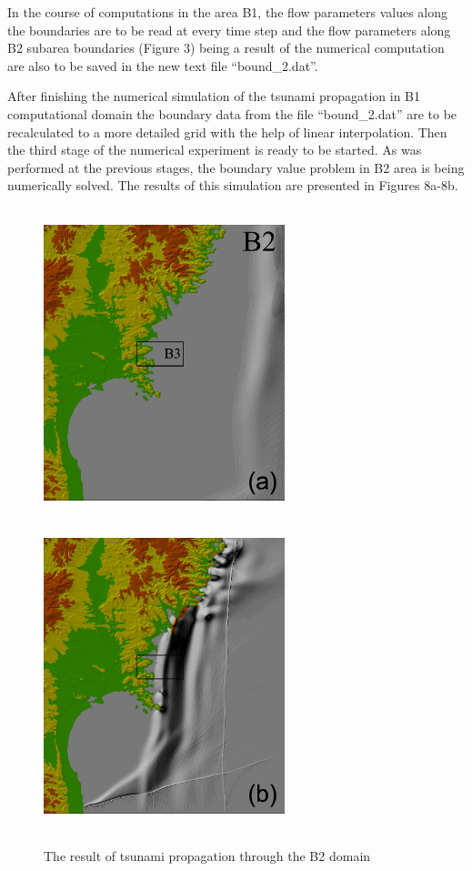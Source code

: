 \documentclass{aip-cp}
\begin{document}
In the course of computations in the area B1, the flow parameters values 
along the boundaries are to be read at every time step and the flow 
parameters along B2 subarea boundaries (Figure 3) being a result of the 
numerical computation are also to be saved in the new text file 
``bound{\_}2.dat''. 

After finishing the numerical simulation of the tsunami propagation in B1 
computational domain the boundary data from the file ``bound{\_}2.dat'' are 
to be recalculated to a more detailed grid with the help of linear 
interpolation. Then the third stage of the numerical experiment is ready to 
be started. As was performed at the previous stages, the boundary value 
problem in B2 area is being numerically solved. The results of this 
simulation are presented in Figures 8a-8b.

\begin{figure}[h!]
 \hspace*{3mm}
 \includegraphics[width=7cm,height=9cm]{art/Fig_08_a.png}
 \hfill
 \includegraphics[width=7cm,height=9cm]{art/Fig_08_b.png} \hspace*{3mm}
\\
\parbox[t]{0.45\textwidth}{\caption{The result of tsunami 
propagation through the B2 domain}} \hfill
\end{figure}
\end{document}
